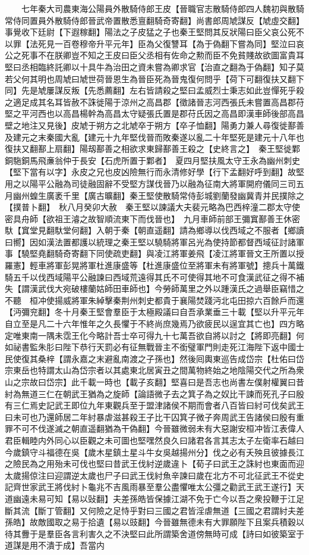 　　七年秦大司農東海公陽員外散騎侍郎王皮【晉職官志散騎侍郎四人魏初與散騎常侍同置員外散騎侍郎晉武帝置散悉亶翻騎奇寄翻】尚書郎周虓謀反【虓虛交翻】事覺收下廷尉【下遐稼翻】陽法之子皮猛之子也秦王堅問其反狀陽曰臣父哀公死不以罪【法死見一百卷穆帝升平元年】臣為父復讐耳【為于偽翻下嘗為同】堅泣曰哀公之死事不在朕卿豈不知之王皮曰臣父丞相有佐命之勲而臣不免貧賤故欲圖富貴耳堅曰丞相臨終託卿以十具牛為治田之資未嘗為卿求官【治直之翻為于偽翻】知子莫若父何其明也周虓曰虓世荷晉恩生為晉臣死為晉鬼復何問乎【荷下可翻復扶又翻下同】先是虓屢謀反叛【先悉薦翻】左右皆請殺之堅曰孟威烈士秉志如此豈憚死乎殺之適足成其名耳皆赦不誅徙陽于涼州之高昌郡【徵諸晉志河西張氏未嘗置高昌郡苻堅之平河西也以高昌楊幹為高昌太守疑張氏置是郡苻氏因之高昌即漢車師後部高昌壁之地注又見後】皮虓于朔方之北虓卒于朔方【卒子恤翻】陽勇力兼人尋復徙鄯善及建元之末秦國大亂【建元十九年堅伐晉而敗秦遂以亂二十年堅死是建元十八年也復扶又翻鄯上扇翻】陽刼鄯善之相欲求東歸鄯善王殺之【史終言之】　秦王堅徙鄴銅駞銅馬飛亷翁仲于長安【石虎所置于鄴者】　夏四月堅扶風太守王永為幽州刺史【堅下當有以字】永皮之兄也皮凶險無行而永清修好學【行下孟翻好呼到翻】故堅用之以陽平公融為司徒融固辭不受堅方謀伐晉乃以融為征南大將軍開府儀同三司五月幽州蝗生廣袤千里【廣古曠翻】秦王堅使散騎常侍彭城劉蘭發幽冀青并民撲除之【撲普卜翻】　秋八月癸卯大赦　秦王堅以諫議大夫裴元略為巴西梓潼二郡太守使密具舟師【欲祖王濬之故智順流東下而伐晉也】　九月車師前部王彌窴鄯善王休密馱【窴堂見翻馱堂何翻】入朝于秦【朝直遥翻】請為鄉導以伐西域之不服者【鄉讀曰嚮】因如漢法置都護以統理之秦王堅以驍騎將軍呂光為使持節都督西域征討諸軍事【驍堅堯翻騎奇寄翻下同使疏吏翻】與凌江將軍姜飛【凌江將軍晉文王所置以授羅憲】輕車將軍彭晃將軍杜進康盛等【杜進康盛位至將軍未有將軍號】摠兵十萬鐵騎五千以伐西域陽平公融諫曰西域荒遠得其氏不可使得其地不可食漢武征之得不補失【謂漢武伐大宛破樓蘭姑師田車師也】今勞師萬里之外以踵漢氏之過舉臣竊惜之不聽　桓冲使揚威將軍朱綽擊秦荆州刺史都貴于襄陽焚踐沔北屯田掠六百餘戶而還【沔彌兖翻】冬十月秦王堅會羣臣于太極殿議曰自吾承業垂三十載【堅以升平元年自立至是凡二十六年惟年之久長懼于不終尚庶幾焉乃欲疲民以逞宜其亡也】四方略定唯東南一隅未霑王化今略計吾士卒可得九十七萬吾欲自將以討之【將即亮翻】何如祕書監朱肜曰陛下恭行天罰必有征無戰晉主不銜璧軍門則走死江海陛下返中國士民使復其桑梓【謂永嘉之末避亂南渡之子孫也】然後囘輿東巡告成岱宗【杜佑曰岱宗東岳也特謂太山為岱宗者以其處東北居寅丑之間萬物終始之地陰陽交代之所為衆山之宗故曰岱宗】此千載一時也【載子亥翻】堅喜曰是吾志也尚書左僕射權翼曰昔紂為無道三仁在朝武王猶為之旋師【論語微子去之箕子為之奴比干諫而死孔子曰殷有三仁焉史記武王即位九年東觀兵至于盟津諸侯不期而會者八百皆曰紂可伐矣武王曰未可也乃還師居二年紂暴虐滋甚殺王子比干囚箕子微子奔周武王告諸侯曰殷有重罪不可不伐遂滅之朝直遥翻猶為干偽翻】今晉雖微弱未有大惡謝安桓冲皆江表偉人君臣輯睦内外同心以臣觀之未可圖也堅嘿然良久曰諸君各言其志太子左衛率石越曰今歲鎮守斗福德在吳【歲木星鎮土星斗牛女吳越揚州分】伐之必有夭殃且彼據長江之險民為之用殆未可伐也堅曰昔武王伐紂逆歲違卜【荀子曰武王之誅紂也東面而迎太歲揚倞注曰迎謂逆太歲也尸子曰武王伐紂魚辛諫曰歲在北方不可北征武王不從史記齊世家武王將伐紂卜龜兆不吉風雨暴至羣公盡懼唯太公彊之勸武王武王遂行】天道幽遠未易可知【易以䜴翻】夫差孫皓皆保據江湖不免于亡今以吾之衆投鞭于江足斷其流【斷丁管翻】又何險之足恃乎對曰三國之君皆淫虐無道【三國之君謂紂夫差孫皓】故敵國取之易于拾遺【易以豉翻】今晉雖無德未有大罪願陛下且案兵積穀以待其釁于是羣臣各言利害久之不決堅曰此所謂築舍道傍無時可成【詩曰如彼築室于道謀是用不潰于成】吾當内